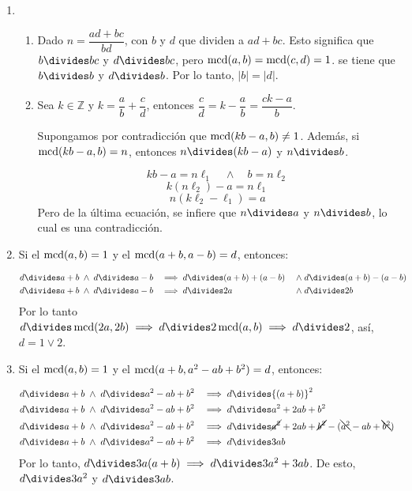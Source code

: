 \begin{enumerate}[font={\bfseries},label={\arabic*.}]
\item
	\begin{enumerate}[font={\bfseries}]
	\item Dado $n=\dfrac{ad+bc}{bd}$, con $b$ y $d$ que dividen a $ad+bc$. Esto significa que $b\divides bc$ y $d\divides bc$, pero $\operatorname{mcd}(a,b)=\operatorname{mcd}(c,d)=1$. se tiene que $b\divides b$ y $d\divides b$. Por lo tanto, $|b|=|d|$.
	
	\item Sea $k\in\mathbb{Z}$ y $k=\dfrac{a}{b}+\dfrac{c}{d}$, entonces $\dfrac{c}{d}=k-\dfrac{a}{b}=\dfrac{ck-a}{b}$.
	
	Supongamos por contradicción que $\operatorname{mcd}(kb-a,b)\neq1$. Además, si $\operatorname{mcd}(kb-a,b)=n$, entonces $n\divides (kb-a)$ y  $n\divides b$.
		
	\[kb-a=n\ell_1\quad\wedge\quad b=n\ell_2\]
	\[k(n\ell_2)-a=n\ell_1\]
	\[n(k\ell_2-\ell_1)=a\]
	Pero de la última ecuación, se infiere que $n\divides a$ y $n\divides b$, lo cual es una contradicción.
	\end{enumerate}
	
	\item Si el $\operatorname{mcd}(a,b)=1$ y el $\operatorname{mcd}(a+b,a-b)=d$, entonces:
	
	\begin{align*}
	d\divides a+b\;&\wedge\; d\divides a-b&\implies d&\divides (a+b)+(a-b)\;&\wedge\; d&\divides (a+b)-(a-b)&\\
	d\divides a+b\;&\wedge\; d\divides a-b&\implies d&\divides 2a\;&\wedge\; d&\divides 2b&
	\end{align*}
	Por lo tanto $d\divides \mcd(2a,2b)\implies d\divides 2\mcd(a,b)\implies d\divides 2$, así, $d=1\vee2$.
	
	\item Si el $\operatorname{mcd}(a,b)=1$ y el $\operatorname{mcd}(a+b,a^{2}-ab+b^{2})=d$, entonces:
	
	\begin{align*}
	d\divides a+b\;&\wedge\; d\divides a^{2}-ab+b^{2}&\implies d&\divides {(a+b)}^{2}\;&\\
	d\divides a+b\;&\wedge\; d\divides a^{2}-ab+b^{2}&\implies d&\divides a^{2}+2ab+b^{2}\;&\\
	d\divides a+b\;&\wedge\; d\divides a^{2}-ab+b^{2}&\implies d&\divides
	\cancel{a^{2}}+2ab+\cancel{b^{2}}-(\bcancel{a^{2}}-ab+\bcancel{b^{2}})\;&&\\
	d\divides a+b\;&\wedge\; d\divides a^{2}-ab+b^{2}&\implies d&\divides3ab
	&
	\end{align*}
	Por lo tanto, $d\divides 3a(a+b)\implies d\divides 3a^{2}+3ab$. De esto, $d\divides 3a^{2}$ y $d\divides 3ab$.
	

\end{enumerate}
